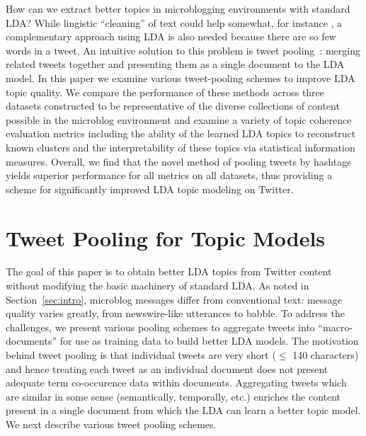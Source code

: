 \documentclass{sig-alternate}
\begin{document}
How can we extract better topics in microblogging environments with
standard LDA?  While lingistic ``cleaning'' of text could help
somewhat, for instance \cite{Han2012}, a complementary approach using
LDA is also needed because there are so few words in a tweet.  An
intuitive solution to this problem is tweet
pooling~\cite{Weng2010wsdm,hong}: merging related tweets together and
presenting them as a single document to the LDA model.  In this paper
we examine various tweet-pooling schemes to improve LDA topic quality.
We compare the performance of these methods across three datasets
constructed to be representative of the diverse collections of content
possible in the microblog environment and examine a variety of topic
coherence evaluation metrics including the ability of the learned LDA
topics to reconstruct known clusters and the interpretability of
these topics via statistical information measures.  
%
Overall, we find that the novel method of pooling tweets by 
hashtags yields superior performance for all metrics on all datasets,
thus providing a scheme for significantly improved LDA topic modeling
on Twitter.



\section{Tweet Pooling for Topic Models}

\label{sec:pooling}

The goal of this paper is to obtain better LDA topics from Twitter
content without modifying the basic machinery of standard LDA.  As
noted in Section~\ref{sec:intro}, microblog messages differ from
conventional text: message quality varies greatly, from newswire-like
utterances to babble.  To address the challenges, we present various
pooling schemes to aggregate tweets into ``macro-documents'' for use
as training data to build better LDA models.  The motivation behind
tweet pooling is that individual tweets are very short ($\leq$ 140
characters) and hence treating each tweet as an individual document
does not present adequate term co-occurence data within documents.
Aggregating tweets which are similar in some sense (semantically,
temporally, etc.) enriches the content present in a single document
from which the LDA can learn a better topic model.  We next describe
various tweet pooling schemes.
\end{document}
